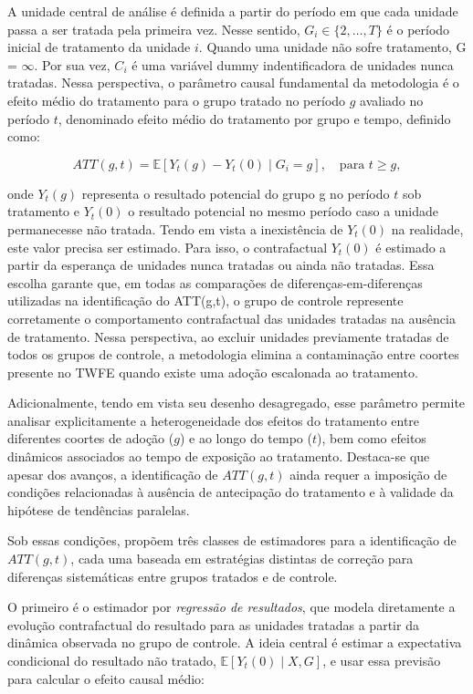 \documentclass[12pt,a4paper,oneside]{article}
\begin{document}
A unidade central de análise é definida a partir do período em que cada unidade passa a ser tratada pela primeira vez. Nesse sentido, $G_i \in \{2, \dots, T\}$ é o período inicial de tratamento da unidade $i$. Quando uma unidade não sofre tratamento, G = $\infty$. Por sua vez, $C_i$ é uma variável dummy indentificadora de unidades nunca tratadas. Nessa perspectiva, o parâmetro causal fundamental da metodologia é o efeito médio do tratamento para o grupo tratado no período $g$ avaliado no período $t$, denominado efeito médio do tratamento por grupo e tempo, definido como:

\begin{equation}
	ATT(g,t) = \mathbb{E}\left[ Y_t(g) - Y_t(0) \mid G_i = g \right], \quad \text{para } t \geq g,
\end{equation}

onde $Y_t(g)$ representa o resultado potencial do grupo g no período $t$ sob tratamento e $Y_t(0)$ o resultado potencial no mesmo período caso a unidade permanecesse não tratada. Tendo em vista a inexistência de $Y_t(0)$ na realidade, este valor precisa ser estimado. Para isso, o contrafactual $Y_t(0)$ é estimado a partir da esperança de unidades nunca tratadas ou ainda não tratadas. Essa escolha garante que, em todas as comparações de diferenças-em-diferenças utilizadas na identificação do ATT(g,t), o grupo de controle represente corretamente o comportamento contrafactual das unidades tratadas na ausência de tratamento. Nessa perspectiva, ao excluir unidades previamente tratadas de todos os grupos de controle, a metodologia elimina a contaminação entre coortes presente no TWFE quando existe uma adoção escalonada ao tratamento. 

Adicionalmente, tendo em vista seu desenho desagregado, esse parâmetro permite analisar explicitamente a heterogeneidade dos efeitos do tratamento entre diferentes coortes de adoção ($g$) e ao longo do tempo ($t$), bem como efeitos dinâmicos associados ao tempo de exposição ao tratamento. Destaca-se que apesar dos avanços, a identificação de $ATT(g,t)$ ainda requer a imposição de condições relacionadas à ausência de antecipação do tratamento e à validade da hipótese de tendências paralelas. 

Sob essas condições, \citet{Callaway2021} propõem três classes de estimadores para a identificação de \(ATT(g,t)\), cada uma baseada em estratégias distintas de correção para diferenças sistemáticas entre grupos tratados e de controle.

O primeiro é o estimador por \textit{regressão de resultados}, que modela diretamente a evolução contrafactual do resultado para as unidades tratadas a partir da dinâmica observada no grupo de controle. A ideia central é estimar a expectativa condicional do resultado não tratado, \(\mathbb{E}[Y_t(0) \mid X, G]\), e usar essa previsão para calcular o efeito causal médio:
\end{document}
